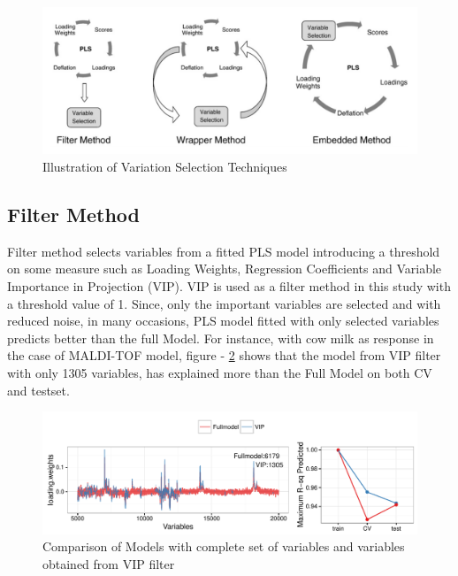 \documentclass[10pt, a4paper]{article}\usepackage[]{graphicx}\usepackage[]{color}
\makeatletter
\def\maxwidth{ %
  \ifdim\Gin@nat@width>\linewidth
    \linewidth
  \else
    \Gin@nat@width
  \fi
}
\newenvironment{knitrout}{}{} %
\makeatother
\begin{document}
\begin{figure}[H]
\begin{center}
    \includegraphics[width=\textwidth]{figure/varSelMethods.png}
\end{center}
\caption{Illustration of Variation Selection Techniques}
\label{fig:varSelMethods}
\end{figure}

\subsection{Filter Method}
Filter method selects variables from a fitted PLS model introducing a threshold on some measure such as Loading Weights, Regression Coefficients and Variable Importance in Projection (VIP). VIP is used as a filter method in this study with a threshold value of 1. Since, only the important variables are selected and with reduced noise, in many occasions, PLS model fitted with only selected variables predicts better than the full Model. For instance, with cow milk as response in the case of MALDI-TOF model, figure - \ref{fig:VIPcowCompare} shows that the model from VIP filter with only 1305 variables, has explained more than the Full Model on both CV and testset.

\begin{knitrout}\small
{}\color{fgcolor}\begin{figure}[H]
\includegraphics[width=\maxwidth]{figure/VIPcowCompare-1} \caption[Comparison of Models with complete set of variables and variables obtained from VIP filter]{Comparison of Models with complete set of variables and variables obtained from VIP filter}\label{fig:VIPcowCompare}
\end{figure}


\end{knitrout}
\end{document}
